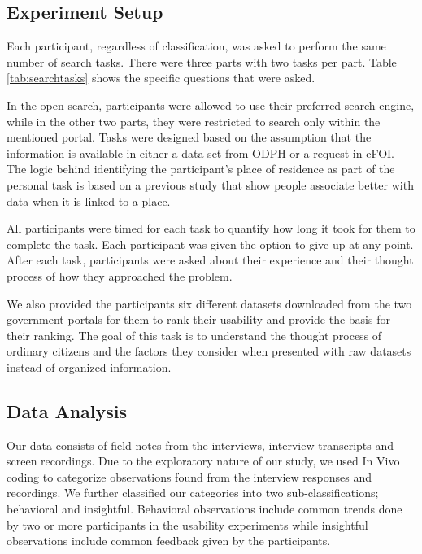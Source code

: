 \documentclass{sigchi}
\begin{document}

\subsection{Experiment Setup}
Each participant, regardless of classification, was asked to perform the same number of search tasks. There were three parts with two tasks per part. Table \ref{tab:searchtasks} shows the specific questions that were asked. 

In the open search, participants were allowed to use their preferred search engine, while in the other two parts, they were restricted to search only within the mentioned portal. Tasks were designed based on the assumption that the information is available in either a data set from ODPH or a request in eFOI. The logic behind identifying the participant's place of residence as part of the personal task is based on a previous study \cite{Puussaar2018} that show people associate better with data when it is linked to a place.

All participants were timed for each task to quantify how long it took for them to complete the task. Each participant was given the option to give up at any point. After each task, participants were asked about their experience and their thought process of how they approached the problem.

We also provided the participants six different datasets downloaded from the two government portals for them to rank their usability and provide the basis for their ranking. The goal of this task is to understand the thought process of ordinary citizens and the factors they consider when presented with raw datasets instead of organized information. 

\subsection{Data Analysis}
Our data consists of field notes from the interviews, interview transcripts and screen recordings. Due to the exploratory nature of our study, we used In Vivo coding to categorize observations found from the interview responses and recordings. We further classified our categories into two sub-classifications; behavioral and insightful. Behavioral observations include common trends done by two or more participants in the usability experiments while insightful observations include common feedback given by the participants.  
\end{document}
